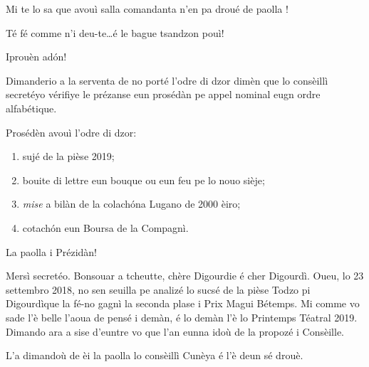 \begin{drama}
\Sophiespeaks Mi te lo sa que avouì salla comandanta  n'en pa droué de paolla \quei!

\Jordyspeaks {} Té fé comme n'i deu-te\ldots é le bague tsandzon pouì!

\Sophiespeaks Iprouèn ad\'on!


\Presidanspeaks Dimanderio a la serventa de no porté l’odre di dzor dimèn que lo consèillì secretéyo vérifiye le prézanse eun prosédàn pe appel nominal eugn ordre alfabétique.


\Secreteospeaks Prosédèn avouì l’odre di dzor:
\begin{enumerate}
\item sujé de la pièse 2019;
\item bouite di lettre eun bouque ou eun feu pe lo nouo sièje;
\item \textit{mise} a bilàn de la \og colach\'on\fg a Lugano  de 2000 èiro; 
\item cotach\'on eun Boursa de la Compagnì.
\end{enumerate}
La paolla i Prézidàn!

\Presidanspeaks {} Mersì secretéo. Bonsouar a tcheut\-te, chère Digourdie é cher Digourdì. Oueu, lo 23 settembro 2018, no sen seuilla pe analizé lo sucsé de la pièse \og Todzo pi Digourdì\fg que la fé-no gagnì la seconda plase i Prix Magui Bétemps.
Mi comme vo sade l'è belle l’aoua de pensé i demàn, é lo demàn l’è lo Printemps Téatral 2019. Dimando ara a sise d'eun\-tre vo que l'an eunna idoù de la propozé i Consèille.


\Presidanspeaks L’a dimandoù de èi la paolla lo consèillì Cunèya é l’è deun sé drouè.



\end{drama}
